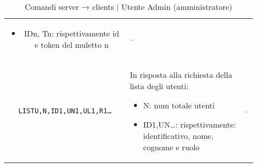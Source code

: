 \begin{table}[h!]
\begin{tabular}{|c|p{8cm}|c|}
\begin{itemize}
                \item IDn, Tn: rispettivamente id e token del muletto n
            \end{itemize}
            & -- \\

            \texttt{LISTU,N,ID1,UN1,UL1,R1…} & In risposta alla richiesta della lista degli utenti:
            \begin{itemize}
                \item N: num totale utenti

                \item ID1,UN…: rispettivamente: identificativo, nome, cognome e ruolo
            \end{itemize}
            & -- \\


            \hline
        \end{tabular}
        \caption{Comandi server → clients | Utente Admin (amministratore)}
    \end{table}


\begin{comment}
\begin{longtable}[h!]{|p{2cm}|p{8cm}|p{2cm}|}
\hline
\rowcolorhead
\multicolumn{3}{|c|}{\headertitle{FORKLIFTS}}\\
\hline
\rowcolorhead
\headertitle{Comando} & \headertitle{Descrizione} & \headertitle{Risposta} \\
\hline
POS,X,Y,DIR & posizione attuale del muletto, considerando la mappa come una matrice:\newline
\begin{itemize}
\item     X: riga della matrice
\item     Y: colonna ““
\item     DIR: orientamento assoluto secondo enum Orientation
\end{itemize}

& -- \\
LIST & richiede nuova lista di task\textsubscript{G} da completare & LIST... \\




\caption{prova}
\end{longtable}
\end{comment}














